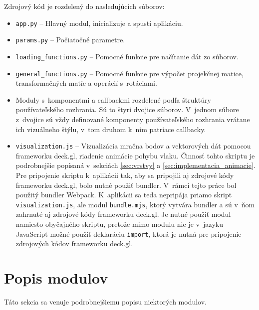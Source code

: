 Zdrojový kód je rozdelený do nasledujúcich súborov:
\begin{itemize}
    \item \texttt{app.py} -- Hlavný modul, inicializuje a spustí aplikáciu.
    \item \texttt{params.py} -- Počiatočné parametre.
    \item \texttt{loading\_functions.py} -- Pomocné funkcie pre načítanie dát zo súborov.
    \item \texttt{general\_functions.py} -- Pomocné funkcie pre výpočet projekčnej matice, transformačných matíc a operácií s~rotáciami.
    \item Moduly s~komponentmi a callbackmi rozdelené podľa štruktúry používateľského rozhrania. Sú to štyri dvojice súborov. V~jednom súbore z~dvojice sú vždy definované komponenty používateľského rozhrania vrátane ich vizuálneho štýlu, v~tom druhom k~nim patriace callbacky.
    \item \texttt{visualization.js} -- Vizualizácia mračna bodov a vektorových dát pomocou frameworku deck.gl, riadenie animácie pohybu vlaku. Činnosť tohto skriptu je podrobnejšie popísaná v~sekciách \ref{sec:vrstvy} a \ref{sec:implementacia_animacie}. Pre pripojenie skriptu k~aplikácii tak, aby sa pripojili aj zdrojové kódy frameworku deck.gl, bolo nutné použiť bundler. V~rámci tejto práce bol použitý bundler Webpack. K~aplikácii sa teda nepripája priamo skript \texttt{visualization.js}, ale modul \texttt{bundle.mjs}, ktorý vytvára bundler a sú v~ňom zahrnuté aj zdrojové kódy frameworku deck.gl. Je nutné použiť modul namiesto obyčajného skriptu, pretože mimo modulu nie je v~jazyku JavaScript možné použiť deklaráciu \texttt{import}, ktorá je nutná pre pripojenie zdrojových kódov frameworku deck.gl. 
\end{itemize}

\section{Popis modulov}

Táto sekcia sa venuje podrobnejšiemu popisu niektorých modulov.


